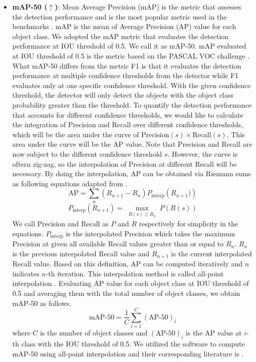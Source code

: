 \begin{itemize}
\item \textbf{mAP-50 ($\uparrow$)}: Mean Average Precision (mAP) is the metric that assesses the detection performance and is the most popular metric used in the benchmarks \cite{padilla_comparative_2021}. mAP is the mean of Average Precision (AP) value for each object class. We adopted the mAP metric that evaluates the detection performance at IOU threshold of 0.5. We call it as mAP-50. mAP evaluated at IOU threshold of 0.5 is the metric based on the PASCAL VOC challenge \cite{everingham_pascal_2015}. What mAP-50 differs from the metric F1 is that it evaluates the detection performance at multiple confidence thresholds from the detector while F1 evaluates only at one specific confidence threshold. With the given confidence threshold, the detector will only detect the objects with the object class probability greater than the threshold. To quantify the detection performance that accounts for different confidence thresholds, we would like to calculate the integration of Precision and Recall over different confidence thresholds, which will be the area under the curve of $\text{Precision}(s) \times \text{Recall}(s)$. This area under the curve will be the AP value. Note that Precision and Recall are now subject to the different confidence threshold $s$. However, the curve is oftern zig-zag, so the interpolation of Precision at different Recall will be necessary. By doing the interpolation, AP can be obtained via Riemann sums as following equations adapted from \cite{padilla_survey_2020} \cite{padilla_comparative_2021}. 
\begin{equation}
\text{AP} = \sum_{n} \left( R_{n+1} - R_{n} \right) P_{\text{interp}} \left( R_{n+1}) \right)
\label{eqn:AP}
\end{equation}
\begin{equation}
P_{\text{interp}} \left( R_{n+1} \right) = \max_{\substack{R \left(s \right) \geq R_{n}}} P \left( R \left(s \right) \right)
\end{equation}
\label{eqn:P_interp}
We call Precision and Recall as $P$ and $R$ respectively for simplicity in the equations. $P_{\text{interp}}$ is the interpolated Precision which takes the maximum Precision at given all available Recall values greater than or equal to $R_{n}$. $R_{n}$ is the previous interpolated Recall value and $R_{n+1}$ is the current interpolated Recall value. Based on this definition, AP can be computed iteratively and $n$ indicates $n$-th iteration. This interpolation method is called all-point interpolation \cite{padilla_survey_2020}. Evaluating AP value for each object class at IOU threshold of 0.5 and averaging them with the total number of object classes, we obtain mAP-50 as follows.
\begin{equation}
\text{mAP-50} = \frac{1}{C} \sum_{i=1}^{C} \left( \text{AP-50} \right)_i
\label{eqn:mAP}
\end{equation}
where $C$ is the number of object classes and $\left( \text{AP-50} \right)_i$ is the AP value at $i$-th class with the IOU threshold of 0.5. We utilized the software \cite{cartucho_cartuchomap_2021} to compute mAP-50 using all-point interpolation and their corresponding literature is \cite{cartucho_robust_2018}.



\end{itemize}

